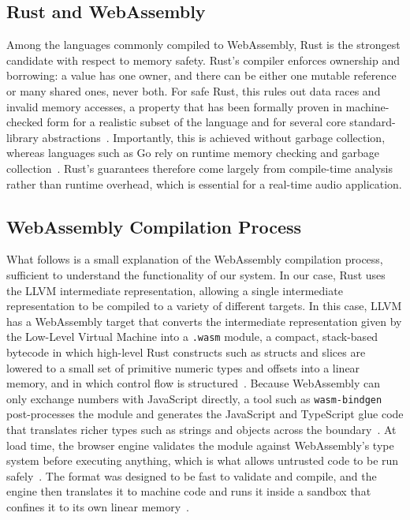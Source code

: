 \subsection{Rust and WebAssembly}

Among the languages commonly compiled to
WebAssembly, Rust is the strongest candidate with respect to memory safety.
Rust's compiler enforces ownership and borrowing: a value has one owner, and
there can be either one mutable reference or many shared ones, never both.
For safe Rust, this rules out data races and invalid memory accesses, a
property that has been formally proven in machine-checked form for a
realistic subset of the language and for several core standard-library
abstractions~\cite{jung2018rustbelt}. Importantly, this is achieved without
garbage collection, whereas languages such as Go rely on runtime memory
checking and garbage collection~\cite{xu2022memory}. Rust's guarantees
therefore come largely from compile-time analysis rather than runtime
overhead, which is essential for a real-time audio application.

\subsection{WebAssembly Compilation Process}


What follows is a small explanation of the WebAssembly compilation process,
sufficient to understand the functionality of our system. In our case, Rust
uses the LLVM intermediate representation, allowing a single intermediate
representation to be compiled to a variety of different targets. In this
case, LLVM has a WebAssembly target that converts the intermediate
representation given by the Low-Level Virtual Machine into a \texttt{.wasm}
module, a compact, stack-based bytecode in which high-level Rust constructs
such as structs and slices are lowered to a small set of primitive numeric
types and offsets into a linear memory, and in which control flow is
structured~\cite{haas2017bringing}. Because WebAssembly can only exchange
numbers with JavaScript directly, a tool such as \texttt{wasm-bindgen}
post-processes the module and generates the JavaScript and TypeScript glue
code that translates richer types such as strings and objects across the
boundary~\cite{wasmbindgen}. At load time, the browser engine validates the
module against WebAssembly's type system before executing anything, which is
what allows untrusted code to be run safely~\cite{haas2017bringing}. The
format was designed to be fast to validate and compile, and the engine then
translates it to machine code and runs it inside a sandbox that confines it
to its own linear memory~\cite{haas2017bringing}.

